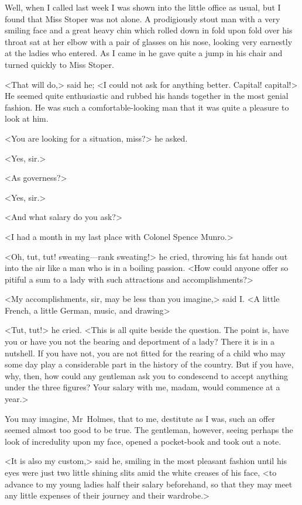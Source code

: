 Well, when I called last week I was shown into the little office as usual, but I found that Miss Stoper was not alone. A prodigiously stout man with a very smiling face and a great heavy chin which rolled down in fold upon fold over his throat sat at her elbow with a pair of glasses on his nose, looking very earnestly at the ladies who entered. As I came in he gave quite a jump in his chair and turned quickly to Miss Stoper.

<That will do,> said he; <I could not ask for anything better. Capital! capital!> He seemed quite enthusiastic and rubbed his hands together in the most genial fashion. He was such a comfortable-looking man that it was quite a pleasure to look at him.

<You are looking for a situation, miss?> he asked.

<Yes, sir.>

<As governess?>

<Yes, sir.>

<And what salary do you ask?>

<I had  a month in my last place with Colonel Spence Munro.>

<Oh, tut, tut! sweating—rank sweating!> he cried, throwing his fat hands out into the air like a man who is in a boiling passion. <How could anyone offer so pitiful a sum to a lady with such attractions and accomplishments?>

<My accomplishments, sir, may be less than you imagine,> said I\@. <A little French, a little German, music, and drawing\longdash>

<Tut, tut!> he cried. <This is all quite beside the question. The point is, have you or have you not the bearing and deportment of a lady? There it is in a nutshell. If you have not, you are not fitted for the rearing of a child who may some day play a considerable part in the history of the country. But if you have, why, then, how could any gentleman ask you to condescend to accept anything under the three figures? Your salary with me, madam, would commence at  a year.>

You may imagine, Mr~Holmes, that to me, destitute as I was, such an offer seemed almost too good to be true. The gentleman, however, seeing perhaps the look of incredulity upon my face, opened a pocket-book and took out a note.

<It is also my custom,> said he, smiling in the most pleasant fashion until his eyes were just two little shining slits amid the white creases of his face, <to advance to my young ladies half their salary beforehand, so that they may meet any little expenses of their journey and their wardrobe.>

